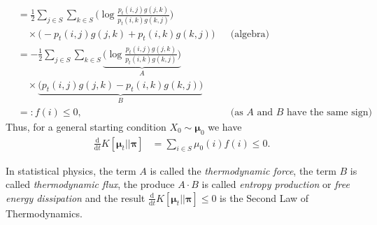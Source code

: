 \documentclass[12pt]{book}
\numberwithin{equation}{chapter}
\theoremstyle{plain}
\newtheorem{theorem}{\underline{Theorem}}
\numberwithin{theorem}{section}
\theoremstyle{definition}
\newtheorem{definition}[theorem]{\underline{Definition}}
\numberwithin{exercise}{chapter}
\let\oldendproof\endproof
\renewenvironment{proof}[1][\proofname]{%
  \oldproof[\scshape\underline{#1}]%
}{\oldendproof}
\newcommand{\<}{\langle}
\renewcommand{\>}{\rangle}
\renewcommand{\(}{\left(}
\renewcommand{\)}{\right)}
\renewcommand{\[}{\left[}
\renewcommand{\]}{\right]}
\newcommand\Pb{\mathds{P}}
\newcommand\Gv{\pmb{G}}
\newcommand\Pv{\pmb{P}}
\newcommand\muv{\pmb{\mu}}
\newcommand\piv{\pmb{\pi}}
\newcommand\dd{\mathrm{d}}
\begin{document}
\begin{proof}
\begin{align}
	  &= \frac{1}{2}\sum_{j \in S} \sum_{k \in S} \Big(  \log \frac{p_t(i,j)g(j,k) }{ p_t(i,k) g(k,j)} \Big)  \\ & \quad
				\times \Big( -p_t{(i, j)}g(j, k) + p_t{(i, k)}g(k, j)\Big) &
				&\text{(algebra)} \\ 
	 &= -\frac{1}{2}\sum_{j \in S} \sum_{k \in S} \underbrace{\Big(  \log \frac{p_t(i,j)g(j,k) }{p_t(i,k) g(k,j)} \Big)}_A  \\ & \quad
				\times \underbrace{ \Big( p_t{(i, j)}g(j, k) - p_t{(i, k)}g(k, j) \Big)}_B\\
	 &=: f(i) \leq 0, &
	&\text{(as $A$ and $B$ have the same sign)} 
\end{align}
Thus, for a general starting condition $X_0 \sim \muv_0$ we have
\begin{align}
\frac{\dd}{\dd t} K[\muv_t||\piv]
	&=\sum_{i \in S} \mu_0(i) f(i) \leq 0 .
\end{align}
\end{proof}

\noindent
In statistical physics, the term $A$ is called the \textit{thermodynamic force}, the term $B$ is called {\em thermodynamic flux}, the produce $A \cdot B$ is called \textit{entropy production} or \textit{free energy dissipation} and the result $\frac{\dd}{\dd t} K[\muv_t||\piv] \leq 0$ is the Second Law of Thermodynamics.

%
%
\end{document}
